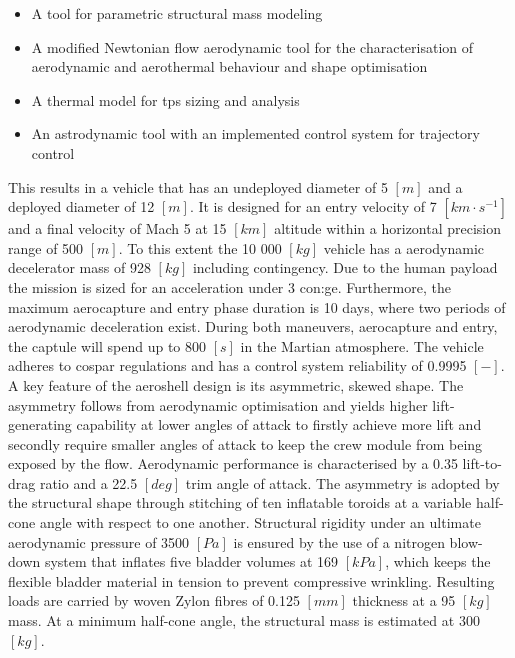 \begin{itemize}
\item A tool for parametric structural mass modeling
\item A modified Newtonian flow aerodynamic tool for the characterisation of aerodynamic and aerothermal behaviour and shape optimisation
\item A thermal model for \acrfull{tps} sizing and analysis
\item An astrodynamic tool with an implemented control system for trajectory control
\end{itemize}
\vspace{1mm}
This results in a vehicle that has an undeployed diameter of 5 $ \left[ m \right] $ and a deployed diameter of 12 $ \left[ m \right] $. It is designed for an entry velocity of 7 $ \left[ km \cdot s^{-1} \right] $ and a final velocity of Mach 5 at  15 $ \left[ km \right] $ altitude within a horizontal precision range of 500 $ \left[ m \right] $. To this extent the 10 000 $ \left[ kg \right] $ vehicle has a aerodynamic decelerator mass of 928 $ \left[ kg \right] $ including contingency. Due to the human payload the mission is sized for an acceleration under 3 \gls{con:ge}. Furthermore, the maximum aerocapture and entry phase duration is 10 days, where two periods of aerodynamic deceleration exist. During both maneuvers, aerocapture and entry, the captule will spend up to 800 $ \left[ s \right] $ in the Martian atmosphere. The vehicle adheres to \acrshort{cospar} regulations and has a control system reliability of 0.9995 $ \left[ - \right] $.
\newline
\newline
A key feature of the aeroshell design is its asymmetric, skewed shape. The asymmetry follows from aerodynamic optimisation and yields higher lift-generating capability at lower angles of attack to firstly achieve more lift and secondly require smaller angles of attack to keep the crew module from being exposed by the flow. Aerodynamic performance is characterised by a 0.35 lift-to-drag ratio and a 22.5 $\left[deg\right]$ trim angle of attack.
\newline
\newline
The asymmetry is adopted by the structural shape through stitching of ten inflatable toroids at a variable half-cone angle with respect to one another. Structural rigidity under an ultimate aerodynamic pressure of 3500 $\left[Pa\right]$ is ensured by the use of a nitrogen blow-down system that inflates five bladder volumes at 169 $\left[kPa\right]$, which keeps the flexible bladder material in tension to prevent compressive wrinkling. Resulting loads are carried by woven Zylon fibres of 0.125 $\left[mm\right]$ thickness at a 95 $\left[kg\right]$ mass. At a minimum half-cone angle, the structural mass is estimated at 300 $\left[kg\right]$. 
